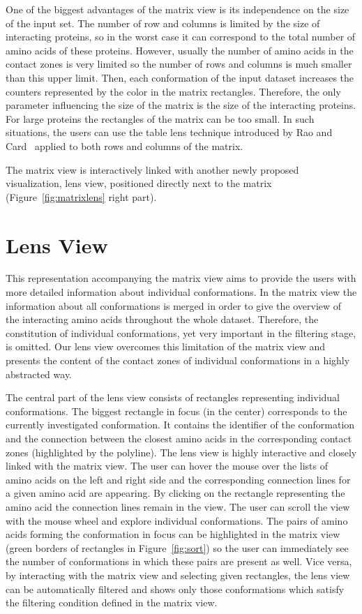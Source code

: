 \documentclass[journal]{vgtc}                %
\begin{document}
One of the biggest advantages of the matrix view is its independence on the size of the input set.
The number of row and columns is limited by the size of interacting proteins, so in the worst case it can correspond to the total number of amino acids of these proteins.
However, usually the number of amino acids in the contact zones is very limited so the number of rows and columns is much smaller than this upper limit.
Then, each conformation of the input dataset increases the counters represented by the color in the matrix rectangles.
Therefore, the only parameter influencing the size of the matrix is the size of the interacting proteins.
For large proteins the rectangles of the matrix can be too small.
In such situations, the users can use the table lens technique introduced by Rao and Card~\cite{Rao1994} applied to both rows and columns of the matrix.

The matrix view is interactively linked with another newly proposed visualization, lens view, positioned directly next to the matrix (Figure~\ref{fig:matrixlens} right part). 

\section{Lens View}
This representation accompanying the matrix view aims to provide the users with more detailed information about individual conformations.
In the matrix view the information about all conformations is merged in order to give the overview of the interacting amino acids throughout the whole dataset.
Therefore, the constitution of individual conformations, yet very important in the filtering stage, is omitted.
Our lens view overcomes this limitation of the matrix view and presents the content of the contact zones of individual conformations in a highly abstracted way.

The central part of the lens view consists of rectangles representing individual conformations. 
The biggest rectangle in focus (in the center) corresponds to the currently investigated conformation. 
It contains the identifier of the conformation and the connection between the closest amino acids in the corresponding contact zones (highlighted by the polyline).
The lens view is highly interactive and closely linked with the matrix view.
The user can hover the mouse over the lists of amino acids on the left and right side and the corresponding connection lines for a given amino acid are appearing.
By clicking on the rectangle representing the amino acid the connection lines remain in the view.
The user can scroll the view with the mouse wheel and explore individual conformations.
The pairs of amino acids forming the conformation in focus can be highlighted in the matrix view (green borders of rectangles in Figure~\ref{fig:sort}) so the user can immediately see the number of conformations in which these pairs are present as well.
Vice versa, by interacting with the matrix view and selecting given rectangles, the lens view can be automatically filtered and shows only those conformations which satisfy the filtering condition defined in the matrix view.
\end{document}

